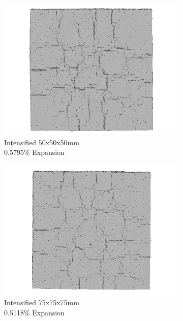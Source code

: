 \begin{figure}[ht!]
    \begin{subfigure}{.3\textwidth}
      \centering
      \includegraphics[width=.9\linewidth]{Files/exp_3D/DEF/A30X0C_3_3ds.png}
    \caption{Intensified 50x50x50mm \\  0.5795\% Expansion}
    \end{subfigure}%
    \begin{subfigure}{.3\textwidth}
      \centering
      \includegraphics[width=.9\linewidth]{Files/exp_3D/DEF/A30X-5C_3_3ds.png}
    \caption{Intensified 75x75x75mm \\  0.5118\% Expansion}
    \end{subfigure}
    \begin{subfigure}{.3\textwidth}
      \centering

\end{subfigure}
\end{figure}
